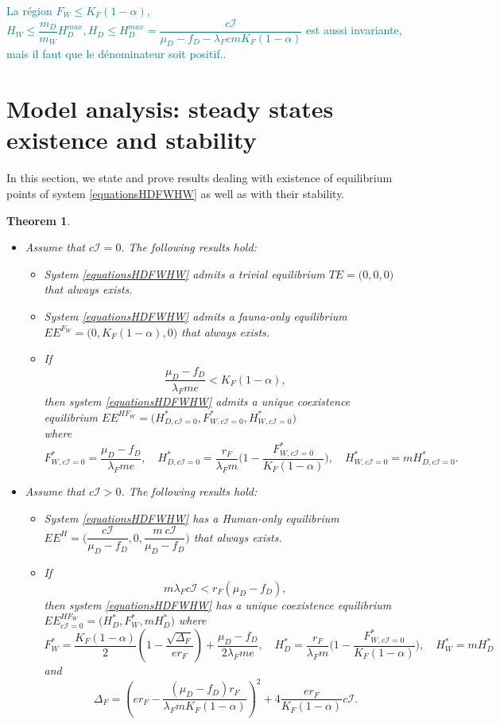 \documentclass{article}
\newcommand{\lfw}{\lambda_{F}}
\newcommand{\lfw}{\lambda_{F}}
\newcommand{\marc}[1]{\textcolor{teal}{#1}}
\newtheorem{theorem}{Theorem}
\begin{document}
\marc{La région $F_W \leq K_F(1-\alpha)$, $H_W \leq  \dfrac{m_D}{m_W} H_D^{max}, H_D \leq H_D^{max} = \dfrac{c\mathcal{I}}{\mu_D - f_D - \lfw e m K_F(1-\alpha)}$ est aussi invariante, mais il faut que le dénominateur soit positif..}


\section{Model analysis: steady states existence and stability}
In this section, we state and prove results dealing with existence of equilibrium points of system \eqref{equationsHDFWHW} as well as with their stability.
\begin{theorem}
\label{theorem-equilibre}
\begin{itemize}
\item Assume that $c\mathcal{I}=0.$ The following results hold:
\begin{itemize}
\item System \eqref{equationsHDFWHW} admits a trivial equilibrium $TE = \Big(0,0,0\Big)$ that always exists.
\item System \eqref{equationsHDFWHW} admits a fauna-only equilibrium $EE^{F_W} = \Big(0, K_F(1-\alpha), 0 \Big)$ that always exists.
\item If 
$$\dfrac{\mu_D - f_D}{\lfw m e}< K_F(1-\alpha),$$ 
then system \eqref{equationsHDFWHW} admits a unique coexistence equilibrium $EE^{HF_W} = \Big(H^*_{D, c\mathcal{I} = 0}, F^*_{W, c\mathcal{I} = 0}, H^*_{W, c\mathcal{I} = 0} \Big)$ \\ 
where 
$$F^*_{W, c\mathcal{I} = 0} = \dfrac{\mu_D - f_D}{\lfw m e},
\quad 
H^*_{D, c\mathcal{I} = 0} = \dfrac{r_F}{\lfw m} \Big(1 - \dfrac{F^*_{W, c\mathcal{I} = 0}}{K_F(1-\alpha)} \Big),
\quad 
H^*_{W, c\mathcal{I} = 0} = m H^*_{D, c\mathcal{I} = 0}.$$
\end{itemize}

\item Assume that $c\mathcal{I} > 0$. The following results hold:
\begin{itemize}
\item System \eqref{equationsHDFWHW} has a Human-only equilibrium $EE^{H} = \Big(\dfrac{c\mathcal{I}}{\mu_D - f_D}, 0, \dfrac{m \ c\mathcal{I}}{\mu_D - f_D} \Big)$ that always exists.
\item If $$m \lfw c\mathcal{I}< r_F (\mu_D -f_D),$$ then system \eqref{equationsHDFWHW} has a unique coexistence equilibrium $EE^{HF_W}_{c\mathcal{I} = 0} = \Big(H^*_{D}, F^*_{W}, m H^*_{D} \Big)$
where
$$F^*_{W} = \dfrac{K_F(1-\alpha)}{2}\left(1 - \dfrac{\sqrt{\Delta_F}}{er_F}\right) + \dfrac{\mu_D - f_D}{2\lfw m e},\quad
H^*_{D} = \dfrac{r_F}{\lfw m} \Big(1 - \dfrac{F^*_{W, c\mathcal{I} = 0}}{K_F(1-\alpha)} \Big),
\quad 
H^*_{W} = m H^*_{D}$$
and
$$
\Delta_F = \left(er_F - \dfrac{(\mu_D - f_D) r_F}{\lfw m K_F(1-\alpha)} \right)^2 + 4\dfrac{er_F}{K_F(1-\alpha)}  c\mathcal{I}.
$$
\end{itemize} 
\end{itemize}
\end{theorem}
\end{document}
